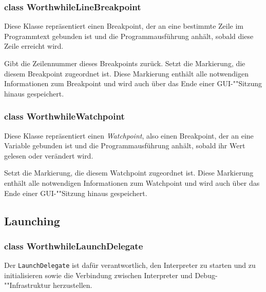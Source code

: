 \subsubsection{class WorthwhileLineBreakpoint}

Diese Klasse repräsentiert einen Breakpoint, der an eine bestimmte Zeile im Programmtext gebunden ist und die Programmausführung anhält, sobald diese Zeile erreicht wird.

\begin{description}
	 Gibt die Zeilennummer dieses Breakpoints zurück.
	 Setzt die Markierung, die diesem Breakpoint zugeordnet ist. Diese Markierung enthält alle notwendigen Informationen zum Breakpoint und wird auch über das Ende einer GUI-""Sitzung hinaus gespeichert.
\end{description}

\subsubsection{class WorthwhileWatchpoint}

Diese Klasse repräsentiert einen \textit{Watchpoint}, also einen Breakpoint, der an eine Variable gebunden ist und die Programmausführung anhält, sobald ihr Wert gelesen oder verändert wird.

\begin{description}
	 Setzt die Markierung, die diesem Watchpoint zugeordnet ist. Diese Markierung enthält alle notwendigen Informationen zum Watchpoint und wird auch über das Ende einer GUI-""Sitzung hinaus gespeichert.
\end{description}

\subsection{Launching}

\subsubsection{class WorthwhileLaunchDelegate}

Der \texttt{LaunchDelegate} ist dafür verantwortlich, den Interpreter zu starten und zu initialisieren sowie die Verbindung zwischen Interpreter und Debug-""Infrastruktur herzustellen.

